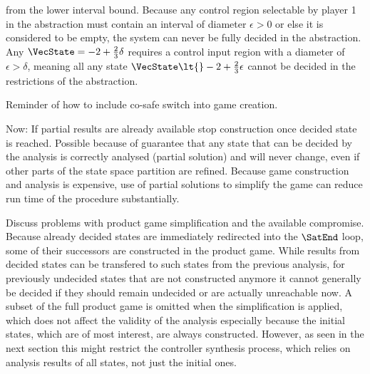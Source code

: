     from the lower interval bound.
    Because any control region selectable by player 1 in the abstraction must contain an interval of diameter $\epsilon > 0$ or else it is considered to be empty, the system can never be fully decided in the abstraction.
    Any $\VecState = -2 + \frac{2}{3} \delta$ requires a control input region with a diameter of $\epsilon > \delta$, meaning all any state $\VecState \lt{} -2 + \frac{2}{3} \epsilon$ cannot be decided in the restrictions of the abstraction.

\stopsubsection


\startsubsection[title={Product Game Simplification}]

    Reminder of how to include co-safe switch into game creation.

    Now: If partial results are already available stop construction once decided state is reached.
    Possible because of guarantee that any state that can be decided by the analysis is correctly analysed (partial solution) and will never change, even if other parts of the state space partition are refined.
    Because game construction and analysis is expensive, use of partial solutions to simplify the game can reduce run time of the procedure substantially.

    Discuss problems with product game simplification and the available compromise.
    Because already decided states are immediately redirected into the $\SatEnd$ loop, some of their successors are constructed in the product game.
    While results from decided states can be transfered to such states from the previous analysis, for previously undecided states that are not constructed anymore it cannot generally be decided if they should remain undecided or are actually unreachable now.
    A subset of the full product game is omitted when the simplification is applied, which does not affect the validity of the analysis especially because the initial states, which are of most interest, are always constructed.
    However, as seen in the next section this might restrict the controller synthesis process, which relies on analysis results of all states, not just the initial ones.

\stopsubsection

